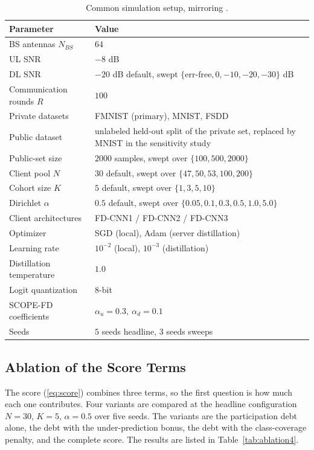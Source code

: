 \documentclass[journal]{IEEEtran}
\newcommand{\rev}[1]{#1}
\begin{document}
\begin{table}[t]
\centering
\caption{Common simulation setup, mirroring \cite{mu2024fedtskd}.}
\label{tab:setup}
\renewcommand{\arraystretch}{1.1}
\footnotesize
\setlength{\tabcolsep}{4pt}
\begin{tabular}{@{}lp{}@{}}
\toprule
\textbf{Parameter} & \textbf{Value} \\
\midrule
BS antennas $N_{BS}$ & $64$ \\
UL SNR & $-8$ dB \\
DL SNR & $-20$ dB default, swept $\{\text{err-free}, 0, -10, -20, -30\}$ dB \\
Communication rounds $R$ & $100$ \\
Private datasets & \rev{FMNIST (primary), MNIST, FSDD} \\
Public dataset & \rev{unlabeled held-out split of the private set, replaced by MNIST in the sensitivity study} \\
\rev{Public-set size} & \rev{$2000$ samples, swept over $\{100, 500, 2000\}$} \\
\rev{Client pool $N$} & \rev{$30$ default, swept over $\{47,50,53,100,200\}$} \\
\rev{Cohort size $K$} & \rev{$5$ default, swept over $\{1,3,5,10\}$} \\
Dirichlet $\alpha$ & \rev{$0.5$ default, swept over $\{0.05,0.1,0.3,0.5,1.0,5.0\}$} \\
Client architectures & FD-CNN1 / FD-CNN2 / FD-CNN3 \\
Optimizer & SGD (local), Adam (server distillation) \\
Learning rate & $10^{-2}$ (local), $10^{-3}$ (distillation) \\
Distillation temperature & $1.0$ \\
Logit quantization & $8$-bit \\
SCOPE-FD coefficients & $\alpha_u = 0.3,\ \alpha_d = 0.1$ \\
\rev{Seeds} & \rev{$5$ seeds headline, $3$ seeds sweeps} \\
\bottomrule
\end{tabular}
\end{table}

\subsection{Ablation of the Score Terms}
\label{ssec:exp-ablation}

\rev{The score (\ref{eq:score}) combines three terms, so the first question is how much each one contributes. Four variants are compared at the headline configuration $N=30$, $K=5$, $\alpha=0.5$ over five seeds. The variants are the participation debt alone, the debt with the under-prediction bonus, the debt with the class-coverage penalty, and the complete score. The results are listed in Table~\ref{tab:ablation4}.}
\end{document}
